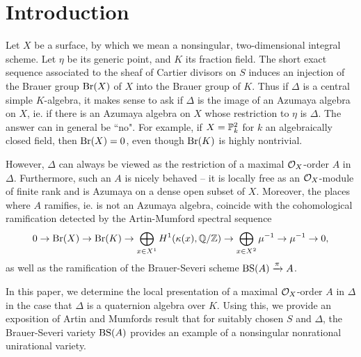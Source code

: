\section{Introduction}
Let $X$ be a surface, by which we mean a nonsingular, two-dimensional integral scheme.  Let $\eta$ be its generic point, and $K$ its fraction field.  The short exact sequence associated to the sheaf of Cartier divisors on $S$ induces an injection of the Brauer group $\textnormal{Br}(X)$ of $X$ into the Brauer group of $K$.  Thus if $\Delta$ is a central simple $K$-algebra, it makes sense to ask if $\Delta$ is the image of an Azumaya algebra on $X$, ie. if there is an Azumaya algebra on $X$ whose restriction to $\eta$ is $\Delta$.  The answer can in general be ``no".  For example, if $X = \mathbb{P}^2_k$ for $k$ an algebraically closed field, then $\textnormal{Br}(X) = 0$, even though $\textnormal{Br}(K)$ is highly nontrivial.

However, $\Delta$ can always be viewed as the restriction of a maximal $\mathcal{O}_X$-order $A$ in $\Delta$.  Furthermore, such an $A$ is nicely behaved -- it is locally free as an $\mathcal{O}_X$-module of finite rank and is Azumaya on a dense open subset of $X$.  Moreover, the places where $A$ ramifies, ie. is not an Azumaya algebra, coincide with the cohomological ramification detected by the Artin-Mumford spectral sequence
$$0\rightarrow\textnormal{Br}(X)\rightarrow\textnormal{Br}(K)\rightarrow\bigoplus_{x\in X^1}H^1(\kappa(x),\mathbb{Q}/\mathbb{Z})\rightarrow \bigoplus_{x\in X^2}\mu^{-1}\rightarrow\mu^{-1}\rightarrow 0,$$
as well as the ramification of the Brauer-Severi scheme $\textnormal{BS}(A)\xrightarrow{\pi}A$.

In this paper, we determine the local presentation of a maximal $\mathcal{O}_X$-order $A$ in $\Delta$ in the case that $\Delta$ is a quaternion algebra over $K$.  Using this, we provide an exposition of Artin and Mumfords result that for suitably chosen $S$ and $\Delta$, the Brauer-Severi variety $\textnormal{BS}(A)$ provides an example of a nonsingular nonrational unirational variety.\cite{big}\cite{small}

